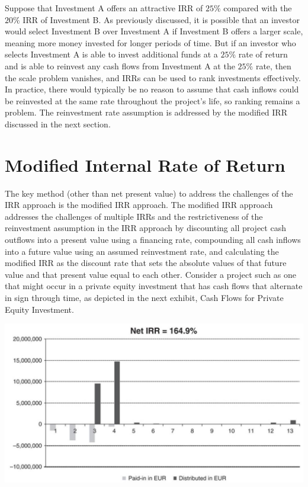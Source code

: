 \documentclass[11pt]{article}
\begin{document}
Suppose that Investment A offers an attractive IRR of $25 \%$ compared with the $20 \%$ IRR of Investment B. As previously discussed, it is possible that an investor would select Investment B over Investment A if Investment B offers a larger scale, meaning more money invested for longer periods of time. But if an investor who selects Investment A is able to invest additional funds at a $25 \%$ rate of return and is able to reinvest any cash flows from Investment A at the $25 \%$ rate, then the scale problem vanishes, and IRRs can be used to rank investments effectively. In practice, there would typically be no reason to assume that cash inflows could be reinvested at the same rate throughout the project's life, so ranking remains a problem. The reinvestment rate assumption is addressed by the modified IRR discussed in the next section.

\section*{Modified Internal Rate of Return}
The key method (other than net present value) to address the challenges of the IRR approach is the modified IRR approach. The modified IRR approach addresses the challenges of multiple IRRs and the restrictiveness of the reinvestment assumption in the IRR approach by discounting all project cash outflows into a present value using a financing rate, compounding all cash inflows into a future value using an assumed reinvestment rate, and calculating the modified IRR as the discount rate that sets the absolute values of that future value and that present value equal to each other. Consider a project such as one that might occur in a private equity investment that has cash flows that alternate in sign through time, as depicted in the next exhibit, Cash Flows for Private Equity Investment.

\begin{center}
\includegraphics[max width=\textwidth]{2024_04_10_6f0546190ca30f08bc91g-4}
\end{center}
\end{document}

